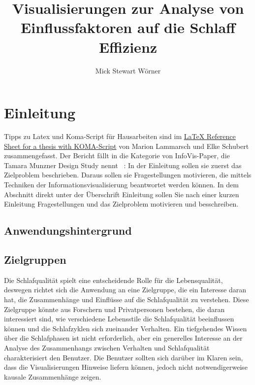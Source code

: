 \documentclass[usegeometry=true]{scrartcl}
\begin{document}
\subject{Projektbericht zum Modul Information Retrieval und Visualisierung Sommersemester 2023}
\title{Visualisierungen zur Analyse von Einflussfaktoren auf die Schlaff Effizienz}
\author{Mick Stewart Wörner}%
\maketitle%
\newpage
\section{Einleitung}
Tipps zu Latex und Koma-Script für Hausarbeiten sind im \href{http://mirrors.ctan.org/info/latex-refsheet/LaTeX_RefSheet.pdf}{LaTeX Reference Sheet for a thesis with KOMA-Script} von Marion Lammarsch und Elke Schubert zusammengefasst. 
Der Bericht fällt in die Kategorie von InfoVis-Paper, die Tamara Munzner Design Study nennt ~\cite{Munzner2008}: In der Einleitung sollen sie zuerst das Zielproblem beschrieben. Daraus sollen sie Fragestellungen motivieren, die mittels Techniken der Informationsvisualisierung beantwortet werden können. In dem Abschnitt direkt unter der Überschrift Einleitung sollen Sie nach einer kurzen Einleitung Fragestellungen und das Zielproblem motivieren und besschreiben. 

\subsection{Anwendungshintergrund}

\subsection{Zielgruppen}

\cite*[The association between sleep quality and quality of life: a population-based study Sujin Lee a , Ji Hyun Kim c , Jae Ho Chung b, ]{2}


Die Schlafqualität spielt eine entscheidende Rolle für die Lebensqualität, deswegen richtet sich die Anwendung 
an eine Zielgruppe, die ein Interesse daran hat, die Zusammenhänge und Einflüsse auf die Schlafqualität zu verstehen.
 Diese Zielgruppe könnte aus Forschern und Privatpersonen bestehen, die daran interessiert sind, wie verschiedene 
 Lebensstile die Schlafqualität beeinflussen können und die Schlafzyklen sich zueinander Verhalten.
 Ein tiefgehendes Wissen über die Schlafphasen ist nicht erforderlich, aber ein generelles Interesse an der Analyse des Zusammenhangs zwischen Verhalten und Schlafqualität charakterisiert den Benutzer.
 Die Benutzer sollten sich darüber im Klaren sein, dass die Visualisierungen Hinweise liefern können, 
 jedoch nicht notwendigerweise kausale Zusammenhänge zeigen.
\end{document}
